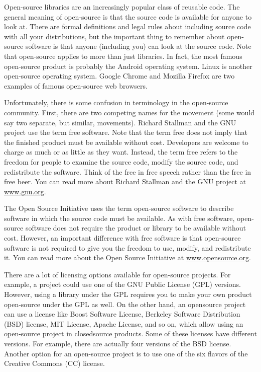 
Open-source libraries are an increasingly popular class of reusable code. The general meaning of open-source is that the source code is available for anyone to look at. There are formal definitions and legal rules about including source code with all your distributions, but the important thing to remember about open-source software is that anyone (including you) can look at the source code. Note that open-source applies to more than just libraries. In fact, the most famous open-source product is probably the Android operating system. Linux is another open-source operating system. Google Chrome and Mozilla Firefox are two examples of famous open-source web browsers.


Unfortunately, there is some confusion in terminology in the open-source community. First, there are two competing names for the movement (some would say two separate, but similar, movements). Richard Stallman and the GNU project use the term free software. Note that the term free does not imply that the finished product must be available without cost. Developers are welcome to charge as much or as little as they want. Instead, the term free refers to the freedom for people to examine the source code, modify the source code, and redistribute the software. Think of the free in free speech rather than the free in free beer. You can read more about Richard Stallman and the GNU project at \url{www.gnu.org}.

The Open Source Initiative uses the term open-source software to describe software in which the source code must be available. As with free software, open-source software does not require the product or library to be available without cost. However, an important difference with free software is that open-source software is not required to give you the freedom to use, modify, and redistribute it. You can read more about the Open Source Initiative at \url{www.opensource.org}.

There are a lot of licensing options available for open-source projects. For example, a project could use one of the GNU Public License (GPL) versions. However, using a library under the GPL requires you to make your own product open-source under the GPL as well. On the other hand, an opensource project can use a license like Boost Software License, Berkeley Software Distribution (BSD) license, MIT License, Apache License, and so on, which allow using an open-source project in closedsource products. Some of these licenses have different versions. For example, there are actually four versions of the BSD license. Another option for an open-source project is to use one of the six flavors of the Creative Commons (CC) license.

